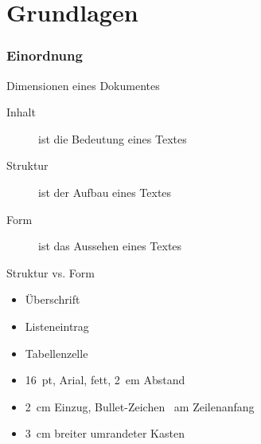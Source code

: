 \malte

\label{chapter-grundlagen}
\chapter{Grundlagen}


\website

\jonny


\subsection{Einordnung}

\begin{Frame}{Dimensionen eines Dokumentes}
  \begin{description}
    \item[Inhalt] ist die \alert{Bedeutung} eines Textes
    \item[Struktur] ist der \alert{Aufbau} eines Textes
    \item[Form] ist das \alert{Aussehen} eines Textes
  \end{description}
\end{Frame}

\begin{Frame}{Struktur vs. Form}
  \begin{Beispiele}[Strukturelemente]
    \begin{itemize}
      \item Überschrift
      \item Listeneintrag
      \item Tabellenzelle
    \end{itemize}
  \end{Beispiele}

  \xxx

  \begin{Beispiele}[Formen]
    \begin{itemize}
      \item 16~pt, Arial, fett, 2~em Abstand
      \item 2~cm Einzug, Bullet-Zeichen \textbullet\ am Zeilenanfang
      \item 3~cm breiter umrandeter Kasten
    \end{itemize}
  \end{Beispiele}
\end{Frame}

